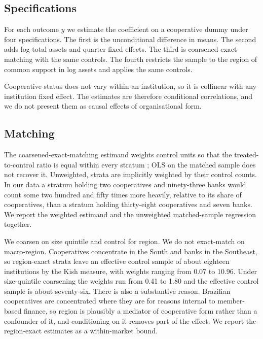 \documentclass[11pt,a4paper]{article}
\begin{document}
\subsection{Specifications}

For each outcome $y$ we estimate the coefficient on a cooperative dummy under four
specifications. The first is the unconditional difference in means. The second adds log
total assets and quarter fixed effects. The third is coarsened exact matching
\citep{iacus2012} with the same controls. The fourth restricts the sample to the region
of common support in log assets and applies the same controls.

Cooperative status does not vary within an institution, so it is collinear with any
institution fixed effect. The estimates are therefore conditional correlations, and we do
not present them as causal effects of organisational form.

\subsection{Matching}
\label{sec:cem}

The coarsened-exact-matching estimand weights control units so that the
treated-to-control ratio is equal within every stratum \citep{iacus2012}; OLS on the
matched sample does not recover it. Unweighted, strata are implicitly weighted by their
control counts. In our data a stratum holding two cooperatives and ninety-three banks
would count some two hundred and fifty times more heavily, relative to its share of
cooperatives, than a stratum holding thirty-eight cooperatives and seven banks. We report
the weighted estimand and the unweighted matched-sample regression together.

We coarsen on size quintile and control for region. We do not exact-match on
macro-region. Cooperatives concentrate in the South and banks in the Southeast, so
region-exact strata leave an effective control sample of about eighteen institutions by
the Kish measure, with weights ranging from 0.07 to 10.96. Under size-quintile coarsening
the weights run from 0.41 to 1.80 and the effective control sample is about seventy-six.
There is also a substantive reason. Brazilian cooperatives are concentrated where they
are for reasons internal to member-based finance, so region is plausibly a mediator of
cooperative form rather than a confounder of it, and conditioning on it removes part of
the effect. We report the region-exact estimates as a within-market bound.
\end{document}
